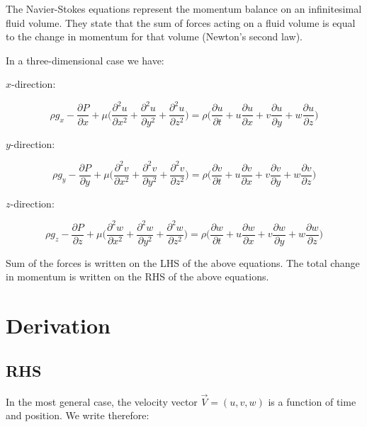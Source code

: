 The Navier-Stokes equations represent the momentum balance on an infinitesimal fluid volume. They state that the sum of forces acting on a fluid volume is equal to the change in momentum for that volume (Newton's second law).

In a three-dimensional case we have:

$x$-direction:

\begin{equation}
\rho g_x - \frac{\partial P}{\partial x} + \mu \Big( \frac{\partial^2 u}{\partial x^2} + \frac{\partial^2 u}{\partial y^2} + \frac{\partial^2 u}{\partial z^2}\Big) = \rho \Big( \frac{\partial u}{\partial t} + u \frac{\partial u}{\partial x} + v \frac{\partial u}{\partial y} + w \frac{\partial u}{\partial z} \Big)
\end{equation}

$y$-direction:

\begin{equation}
\rho g_y - \frac{\partial P}{\partial y} + \mu \Big( \frac{\partial^2 v}{\partial x^2} + \frac{\partial^2 v}{\partial y^2} + \frac{\partial^2 v}{\partial z^2}\Big) = \rho \Big( \frac{\partial v}{\partial t} + u \frac{\partial v}{\partial x} + v \frac{\partial v}{\partial y} + w \frac{\partial v}{\partial z} \Big)
\end{equation}

$z$-direction:

\begin{equation}
\rho g_z - \frac{\partial P}{\partial z} + \mu \Big( \frac{\partial^2 w}{\partial x^2} + \frac{\partial^2 w}{\partial y^2} + \frac{\partial^2 w}{\partial z^2}\Big) = \rho \Big( \frac{\partial w}{\partial t} + u \frac{\partial w}{\partial x} + v \frac{\partial w}{\partial y} + w \frac{\partial w}{\partial z} \Big)
\end{equation}

Sum of the forces is written on the LHS of the above equations. The total change in momentum is written on the RHS of the above equations.

\section{Derivation}

\subsection{RHS}

In the most general case, the velocity vector $\vec{V} = (u, v, w)$ is a function of time and position. We write therefore:


